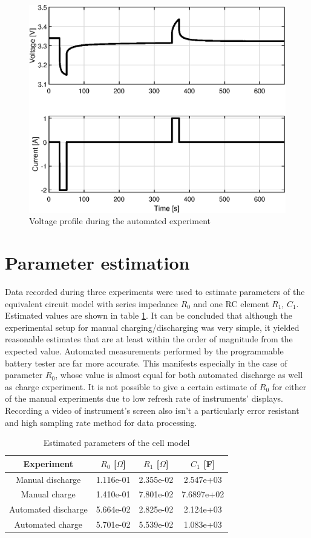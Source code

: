 \begin{figure}[htbp]
    \centering
    \includegraphics{figures/4/automated.eps}
    \caption{Voltage profile during the automated experiment}
    \label{fig:4-automated}
\end{figure}

\section{Parameter estimation}
\label{sec:4-params}
Data recorded during three experiments were used to estimate parameters of the equivalent circuit model with series impedance $R_0$ and one RC element $R_1$, $C_1$. Estimated values are shown in table \ref{tab:4-params}. It can be concluded that although the experimental setup for manual charging/discharging was very simple, it yielded reasonable estimates that are at least within the order of magnitude from the expected value. Automated measurements performed by the programmable battery tester are far more accurate. This manifests especially in the case of parameter $R_0$, whose value is almost equal for both automated discharge as well as charge experiment. It is not possible to give a certain estimate of $R_0$
for either of the manual experiments due to low refresh rate of instruments' displays. Recording a video of instrument's screen also isn't a particularly error resistant and high sampling rate method for data processing.

\begin{table}[htbp]
    \centering
    \begin{tabular}{c|c|c|c}
         Experiment& $R_0$ [$\Omega$] & $R_1$ [$\Omega$] & $C_1$ [F] \\\hline
         Manual discharge  & 1.116e-01  &   2.355e-02  &   2.547e+03 \\
         Manual charge & 1.410e-01   &  7.801e-02 &    7.6897e+02 \\
         Automated discharge & 5.664e-02  &   2.825e-02  &   2.124e+03 \\
         Automated charge & 5.701e-02   &  5.539e-02  &   1.083e+03
  
    \end{tabular}
    \caption{Estimated parameters of the cell model}
    \label{tab:4-params}
\end{table}
